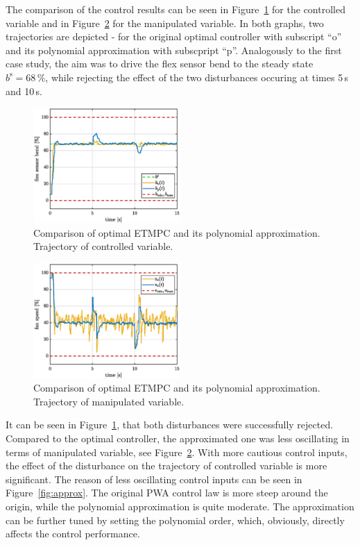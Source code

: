 \documentclass[letterpaper, 10 pt, conference]{ieeeconf}
\begin{document}
The comparison of the control results can be seen in Figure~\ref{fig:poly_y} for the controlled variable and in Figure~\ref{fig:poly_u} for the manipulated variable. In both graphs, two trajectories are depicted - for the original optimal controller with subscript ``o'' and its polynomial approximation with subscpript ``p''. Analogously to the first case study, the aim was to drive the flex sensor bend to the steady state $ b^\mathrm{s} = 68\,\%$, while rejecting the effect of the two disturbances occuring at times 5\,s and 10\,s.

\begin{figure}
	\begin{center}
		\includegraphics[width=0.5\textwidth]{images/poly_b.eps}
		\caption{Comparison of optimal ETMPC and its polynomial approximation. Trajectory of controlled variable.}
		\label{fig:poly_y}
	\end{center}
\end{figure}

\begin{figure}
	\begin{center}
		\includegraphics[width=0.5\textwidth]{images/poly_v.eps}
		\caption{Comparison of optimal ETMPC and its polynomial approximation. Trajectory of manipulated variable.}
		\label{fig:poly_u}
	\end{center}
\end{figure}

It can be seen in Figure~\ref{fig:poly_y}, that both disturbances were successfully rejected. Compared to the optimal controller, the approximated one was less oscillating in terms of manipulated variable, see Figure~\ref{fig:poly_u}. With more cautious control inputs, the effect of the disturbance on the trajectory of controlled variable is more significant. The reason of less oscillating control inputs can be seen in Figure~\ref{fig:approx}. The original PWA control law is more steep around the origin, while the polynomial approximation is quite moderate. The approximation can be further tuned by setting the polynomial order, which, obviously, directly affects the control performance.
\end{document}
